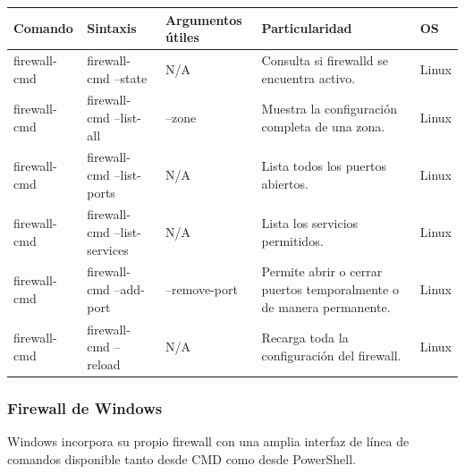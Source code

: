 \documentclass[a4paper,10pt]{article}
\begin{document}
\begin{longtable}{|p{2.8cm}|p{3cm}|p{4cm}|p{5.6cm}|p{1.5cm}|}

\hline
Comando &
Sintaxis &
Argumentos útiles &
Particularidad &
OS
\\
\hline
\endhead

firewall-cmd &
firewall-cmd --state &
N/A &
Consulta si firewalld se encuentra activo. &
Linux
\\
\hline

firewall-cmd &
firewall-cmd --list-all &
--zone &
Muestra la configuración completa de una zona. &
Linux
\\
\hline

firewall-cmd &
firewall-cmd --list-ports &
N/A &
Lista todos los puertos abiertos. &
Linux
\\
\hline

firewall-cmd &
firewall-cmd --list-services &
N/A &
Lista los servicios permitidos. &
Linux
\\
\hline

firewall-cmd &
firewall-cmd --add-port &
--remove-port &
Permite abrir o cerrar puertos temporalmente o de manera permanente. &
Linux
\\
\hline

firewall-cmd &
firewall-cmd --reload &
N/A &
Recarga toda la configuración del firewall. &
Linux
\\
\hline

\end{longtable}


\subsubsection{Firewall de Windows}

Windows incorpora su propio firewall con una amplia interfaz de línea de
comandos disponible tanto desde CMD como desde PowerShell.
\end{document}
